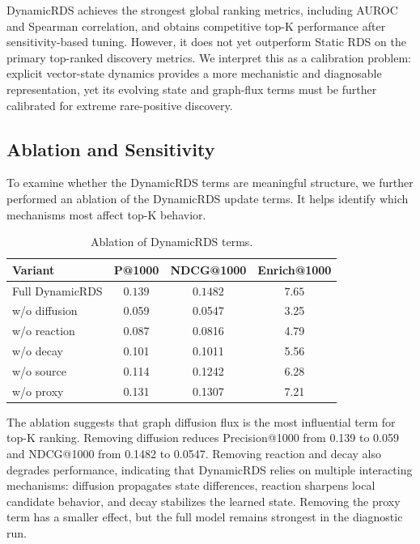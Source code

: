 \documentclass[conference]{IEEEtran}
\begin{document}
DynamicRDS achieves the strongest global ranking metrics, including AUROC and Spearman correlation, and obtains competitive top-K performance after sensitivity-based tuning. However, it does not yet outperform Static RDS on the primary top-ranked discovery metrics. We interpret this as a calibration problem: explicit vector-state dynamics provides a more mechanistic and diagnosable representation, yet its evolving state and graph-flux terms must be further calibrated for extreme rare-positive discovery.

\subsection{Ablation and Sensitivity}

To examine whether the DynamicRDS terms are meaningful structure, we further performed an  ablation of the DynamicRDS update terms. It helps identify which mechanisms most affect top-K behavior.

\begin{table}[t]
\caption{Ablation of DynamicRDS terms.}
\label{tab:ablation}
\centering
\small
\begin{tabular}{lccc}
\hline
Variant & P@1000 & NDCG@1000 & Enrich@1000 \\
\hline
Full DynamicRDS & $\mathbf{0.139}$ & $\mathbf{0.1482}$ & $\mathbf{7.65}$ \\
w/o diffusion & 0.059 & 0.0547 & 3.25 \\
w/o reaction & 0.087 & 0.0816 & 4.79 \\
w/o decay & 0.101 & 0.1011 & 5.56 \\
w/o source & 0.114 & 0.1242 & 6.28 \\
w/o proxy & 0.131 & 0.1307 & 7.21 \\
\hline
\end{tabular}
\end{table}

The ablation suggests that graph diffusion flux is the most influential term for top-K ranking. Removing diffusion reduces Precision@1000 from 0.139 to 0.059 and NDCG@1000 from 0.1482 to 0.0547. Removing reaction and decay also degrades performance, indicating that DynamicRDS relies on multiple interacting mechanisms: diffusion propagates state differences, reaction sharpens local candidate behavior, and decay stabilizes the learned state. Removing the proxy term has a smaller effect, but the full model remains strongest in the diagnostic run.
\end{document}
